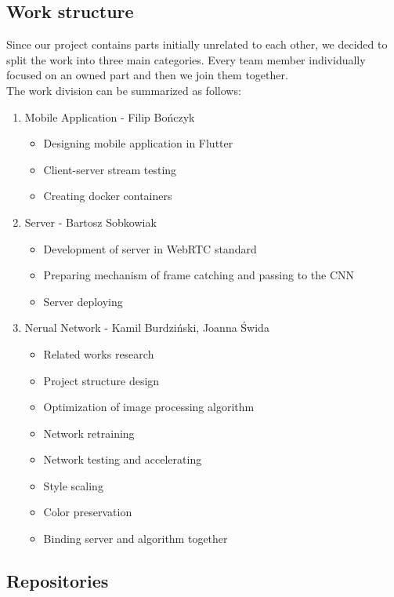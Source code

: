 \documentclass[../Main.tex]{subfiles}
\begin{document}
\subsection{Work structure}
Since our project contains parts initially unrelated to each other, we decided to split the work into three main categories. Every team member individually focused on an owned part and then we join them together. \\
The work division can be summarized as follows:
\begin{enumerate}
    \item Mobile Application - Filip Bończyk
        \begin{itemize}
            \item Designing mobile application in Flutter
            \item Client-server stream testing 
            \item Creating docker containers
        \end{itemize}
    \item Server - Bartosz Sobkowiak
        \begin{itemize}
            \item Development of server in WebRTC standard
            \item Preparing mechanism of frame catching and passing to the CNN
            \item Server deploying
        \end{itemize}
    \item Nerual Network - Kamil Burdziński, Joanna Świda
        \begin{itemize}
            \item Related works research
            \item Project structure design
            \item Optimization of image processing algorithm
            \item Network retraining
            \item Network testing and accelerating
            \item Style scaling
            \item Color preservation
            \item Binding server and algorithm together
        \end{itemize}
\end{enumerate}

\newpage
\subsection{Repositories}
\end{document}
